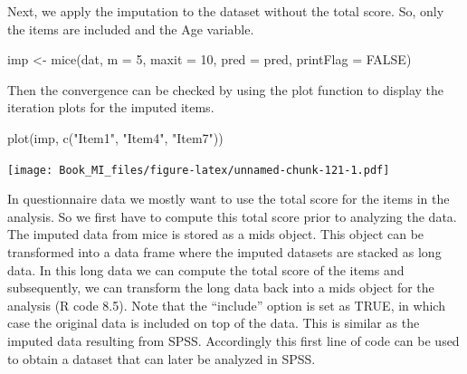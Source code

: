 \documentclass[
]{book}
\newenvironment{Shaded}{\begin{snugshade}}{\end{snugshade}}
\newcommand{\AttributeTok}[1]{\textcolor[rgb]{0.77,0.63,0.00}{#1}}
\newcommand{\CommentTok}[1]{\textcolor[rgb]{0.56,0.35,0.01}{\textit{#1}}}
\newcommand{\ConstantTok}[1]{\textcolor[rgb]{0.00,0.00,0.00}{#1}}
\newcommand{\DecValTok}[1]{\textcolor[rgb]{0.00,0.00,0.81}{#1}}
\newcommand{\FunctionTok}[1]{\textcolor[rgb]{0.00,0.00,0.00}{#1}}
\newcommand{\NormalTok}[1]{#1}
\newcommand{\OtherTok}[1]{\textcolor[rgb]{0.56,0.35,0.01}{#1}}
\newcommand{\SpecialCharTok}[1]{\textcolor[rgb]{0.00,0.00,0.00}{#1}}
\newcommand{\StringTok}[1]{\textcolor[rgb]{0.31,0.60,0.02}{#1}}
\begin{document}
\begin{Shaded}
\end{Shaded}

Next, we apply the imputation to the dataset without the total score. So, only the items are included and the Age variable.

\begin{Shaded}
\begin{Highlighting}[]
\NormalTok{imp }\OtherTok{\textless{}{-}} \FunctionTok{mice}\NormalTok{(dat, }\AttributeTok{m =} \DecValTok{5}\NormalTok{, }\AttributeTok{maxit =} \DecValTok{10}\NormalTok{, }\AttributeTok{pred =}\NormalTok{ pred, }\AttributeTok{printFlag =} \ConstantTok{FALSE}\NormalTok{)}
\end{Highlighting}
\end{Shaded}

Then the convergence can be checked by using the plot function to display the iteration plots for the imputed items.

\begin{Shaded}
\begin{Highlighting}[]
\FunctionTok{plot}\NormalTok{(imp, }\FunctionTok{c}\NormalTok{(}\StringTok{"Item1"}\NormalTok{, }\StringTok{"Item4"}\NormalTok{, }\StringTok{"Item7"}\NormalTok{))}
\end{Highlighting}
\end{Shaded}

\texttt{[image: Book\_MI\_files/figure-latex/unnamed-chunk-121-1.pdf]}

In questionnaire data we mostly want to use the total score for the items in the analysis. So we first have to compute this total score prior to analyzing the data. The imputed data from mice is stored as a mids object. This object can be transformed into a data frame where the imputed datasets are stacked as long data. In this long data we can compute the total score of the items and subsequently, we can transform the long data back into a mids object for the analysis (R code 8.5). Note that the ``include'' option is set as TRUE, in which case the original data is included on top of the data. This is similar as the imputed data resulting from SPSS. Accordingly this first line of code can be used to obtain a dataset that can later be analyzed in SPSS.
\end{document}
